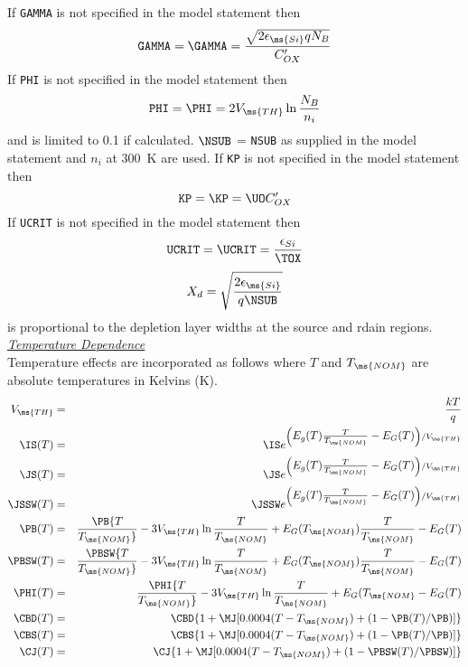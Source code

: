 \noindent If {\tt GAMMA} is not specified in the model statement
then
\begin{equation}
{\tt GAMMA} = \GAMMA = {{\sqrt{2\epsilon_{\ms{Si}} q N_B}} \over
{C'_{OX}}} \label{gammaomitted}
\end{equation}
If {\tt PHI} is not specified in the model statement then
\begin{equation}
{\tt PHI} = \PHI = 2 V_{\ms{TH}} \ln{{N_B}\over{n_i}}
\end{equation}
and is limited to 0.1 if calculated. $\NSUB$ = {\tt NSUB} as
supplied in the model statement and $n_i$ at 300~K are used. If
{\tt KP} is not specified in the model statement then
\begin{equation}
{\tt KP} = \KP = \UO C'_{OX}
\end{equation}
If {\tt UCRIT} is not specified in the model statement then
\begin{equation}
{\tt UCRIT} = \UCRIT = {{\epsilon_{Si}}\over{\textstyle\TOX}}
\end{equation}
\begin{equation}
X_d = \sqrt{{{\textstyle2\epsilon_{\ms{Si}}} \over {\textstyle q
\NSUB}}}
\end{equation}
is proportional to the depletion layer widths at the source and
rdain regions. \vshift \vfill \noindent\underline{\sl \large
Temperature Dependence} 
\\[0.1in]
Temperature effects are incorporated as follows where $T$ and
$T_{\ms{NOM}}$ are absolute temperatures in Kelvins (K).
\begin{eqnarray}
V_{\ms{TH}} & = & {{kT} \over q}\\
\IS (T) & = & \IS e^{\left( \textstyle E_g(T) {T \over
{T_{\ms{NOM}}}}
 - E_G(T) \right) /V_{\ms{TH}}}\\
\JS (T) & = & \JS e^{\left(\textstyle E_g(T) {T \over
{T_{\ms{NOM}}}}
 - E_G(T) \right) /V_{\ms{TH}}}\\
\JSSW (T) & = & \JSSW e^{\left(\textstyle E_g(T) {T \over
{T_{\ms{NOM}}}}
 - E_G(T) \right) /V_{\ms{TH}}}\\
\PB (T) & = & \PB {T \over {T_{\ms{NOM}}}} - 3V_{\ms{TH}} \ln{
                {T \over {T_{\ms{NOM}}}} } + E_G (T_{\ms{NOM}})
                {T \over {T_{\ms{NOM}}}} -E_G(T)\\
\PBSW (T) & = & \PBSW {T \over {T_{\ms{NOM}}}}
 - 3V_{\ms{TH}} \ln{ {T \over {T_{\ms{NOM}}}} }
              + E_G (T_{\ms{NOM}}) {T \over {T_{\ms{NOM}}}} -E_G(T)\\
\PHI (T) & = & \PHI
                {T \over {T_{\ms{NOM}}}} - 3V_{\ms{TH}}
                \ln{ {T \over {T_{\ms{NOM}}}} } + E_G (T_{\ms{NOM}} -E_G(T)\\
\CBD (T) & = & \CBD \{1 + \MJ [0.0004(T-T_{\ms{NOM}})+(1-\PB (T)/\PB )]\} \\
\CBS (T) & = & \CBS \{1 + \MJ [0.0004(T-T_{\ms{NOM}})+(1-\PB (T)/\PB )]\} \\
\CJ (T) & = & \CJ \{1 + \MJ [0.0004(T-T_{\ms{NOM}})+(1-\PBSW
(T)/\PBSW )]\}
\end{eqnarray}

